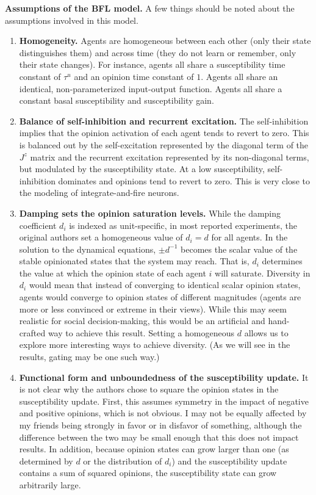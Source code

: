 \documentclass[]{article}
\begin{document}
\textbf{Assumptions of the BFL model.} A few things should be noted about the assumptions involved in this model.
\begin{enumerate}
	\item \textbf{Homogeneity.} Agents are homogeneous between each other (only their state distinguishes them) and across time (they do not learn or remember, only their state changes). For instance, agents all share a susceptibility time constant of $\tau^u$ and an opinion time constant of $1$. Agents all share an identical, non-parameterized input-output function. Agents all share a constant basal susceptibility and susceptibility gain. 
	\item \textbf{Balance of self-inhibition and recurrent excitation.} The self-inhibition implies that the opinion activation of each agent tends to revert to zero. This is balanced out by the self-excitation represented by the diagonal term of the $J^z$ matrix and the recurrent excitation represented by its non-diagonal terms, but modulated by the susceptibility state. At a low susceptibility, self-inhibition dominates and opinions tend to revert to zero. This is very close to the modeling of integrate-and-fire neurons.
	\item \textbf{Damping sets the opinion saturation levels.} While the damping coefficient $d_i$ is indexed as unit-specific, in most reported experiments, the original authors set a homogeneous value of $d_i=d$ for all agents. In the solution to the dynamical equations, $\pm d^{-1}$ becomes the scalar value of the stable opinionated states that the system may reach. That is, $d_i$ determines the value at which the opinion state of each agent $i$ will saturate. Diversity in $d_i$ would mean that instead of converging to identical scalar opinion states, agents would converge to opinion states of different magnitudes (agents are more or less convinced or extreme in their views). While this may seem realistic for social decision-making, this would be an artificial and hand-crafted way to achieve this result. Setting a homogeneous $d$ allows us to explore more interesting ways to achieve diversity. (As we will see in the results, gating may be one such way.)
	\item \textbf{Functional form and unboundedness of the susceptibility update.} It is not clear why the authors chose to square the opinion states in the susceptibility update. First, this assumes symmetry in the impact of negative and positive opinions, which is not obvious. I may not be equally affected by my friends being strongly in favor or in disfavor of something, although the difference between the two may be small enough that this does not impact results. In addition, because opinion states can grow larger than one (as determined by $d$ or the distribution of $d_i$) and the susceptibility update contains a sum of squared opinions, the susceptibility state can grow arbitrarily large.
\end{enumerate}
\end{document}
